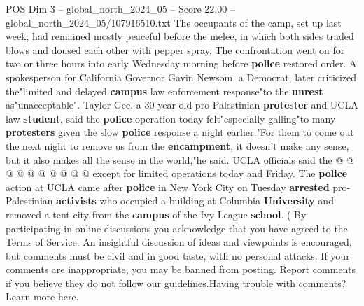 \begin{textsample}{POS Dim 3 – global\_north\_2024\_05 – Score 22.00 – global\_north\_2024\_05/107916510.txt}
The occupants of the camp, set up last week, had remained mostly peaceful before the melee, in which both sides traded blows and doused each other with pepper spray.
The confrontation went on for two or three hours into early Wednesday morning before \textbf{police} restored order.
A spokesperson for California Governor Gavin Newsom, a Democrat, later criticized the"limited and delayed \textbf{campus} law enforcement response"to the \textbf{unrest} as"unacceptable".
Taylor Gee, a 30-year-old pro-Palestinian \textbf{protester} and UCLA law \textbf{student}, said the \textbf{police} operation today felt"especially galling"to many \textbf{protesters} given the slow \textbf{police} response a night earlier."For them to come out the next night to remove us from the \textbf{encampment}, it doesn't make any sense, but it also makes all the sense in the world,"he said.
UCLA officials said the @ @ @ @ @ @ @ @ @ @ except for limited operations today and Friday.
The \textbf{police} action at UCLA came after \textbf{police} in New York City on Tuesday \textbf{arrested} pro-Palestinian \textbf{activists} who occupied a building at Columbia \textbf{University} and removed a tent city from the \textbf{campus} of the Ivy League \textbf{school}. ( By participating in online discussions you acknowledge that you have agreed to the Terms of Service.
An insightful discussion of ideas and viewpoints is encouraged, but comments must be civil and in good taste, with no personal attacks.
If your comments are inappropriate, you may be banned from posting.
Report comments if you believe they do not follow our guidelines.Having trouble with comments?
Learn more here.

\end{textsample}
